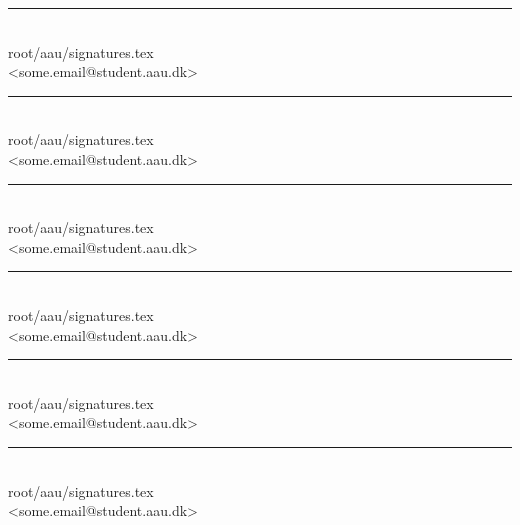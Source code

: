 \begin{minipage}[b]{0.45\textwidth}
 \centering
 \vspace{12pt}
 \rule{\textwidth}{0.5pt}\\
  root/aau/signatures.tex\\
 {\footnotesize <some.email@student.aau.dk>}\\
 \vspace{12pt}
 \centering
 \vspace{12pt}
 \rule{\textwidth}{0.5pt}\\
  root/aau/signatures.tex\\
 {\footnotesize <some.email@student.aau.dk>}\\
 \vspace{12pt}
 \centering
 \vspace{12pt}
 \rule{\textwidth}{0.5pt}\\
  root/aau/signatures.tex\\
 {\footnotesize <some.email@student.aau.dk>}\\
 \vspace{12pt}
\end{minipage}
\hfill
\begin{minipage}[b]{0.45\textwidth}
 \centering
 \vspace{12pt}
 \rule{\textwidth}{0.5pt}\\
  root/aau/signatures.tex\\
 {\footnotesize <some.email@student.aau.dk>}\\
 \vspace{12pt}
 \centering
 \vspace{12pt}
 \rule{\textwidth}{0.5pt}\\
  root/aau/signatures.tex\\
 {\footnotesize <some.email@student.aau.dk>}\\
 \vspace{12pt}
\centering
 \vspace{12pt}
 \rule{\textwidth}{0.5pt}\\
  root/aau/signatures.tex\\
 {\footnotesize <some.email@student.aau.dk>}\\
 \vspace{12pt}
\end{minipage}%